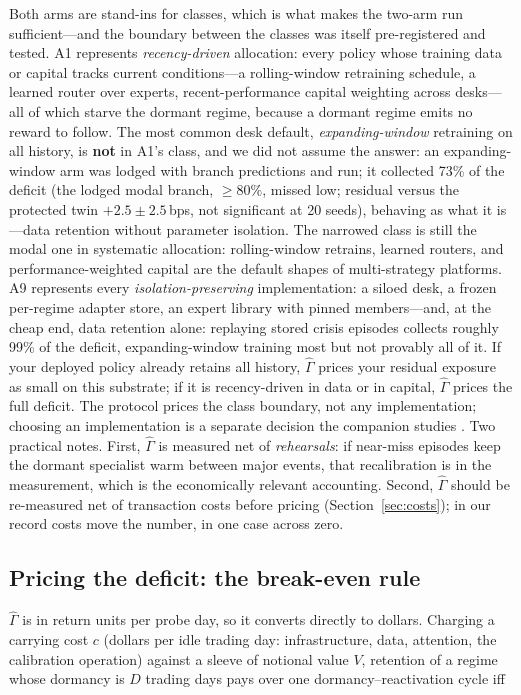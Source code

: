 \documentclass[sigconf,anonymous]{acmart}
\newcommand{\G}{\hat\Gamma}
\begin{document}
Both arms are stand-ins for classes, which is what makes the two-arm
run sufficient---and the boundary between the classes was itself
pre-registered and tested. A1 represents \emph{recency-driven}
allocation: every policy whose training data or capital tracks
current conditions---a rolling-window retraining schedule, a learned
router over experts, recent-performance capital weighting across
desks---all of which starve the dormant regime, because a
dormant regime emits no reward to follow. The most common desk
default, \emph{expanding-window} retraining on all history, is
\textbf{not} in A1's class, and we did not assume the answer: an
expanding-window arm was lodged with branch predictions and run; it
collected 73\% of the deficit (the lodged modal branch, ${\ge}80\%$,
missed low; residual versus the protected twin
$+2.5 \pm 2.5$\,bps, not significant at 20 seeds), behaving as what it
is---data retention without parameter isolation. The narrowed class is
still the modal one in systematic allocation: rolling-window retrains,
learned routers, and performance-weighted capital are the default
shapes of multi-strategy platforms. A9 represents every
\emph{isolation-preserving} implementation: a siloed desk, a frozen
per-regime adapter store, an expert library with pinned members---and,
at the cheap end, data retention alone: replaying stored crisis
episodes collects roughly 99\% of the deficit, expanding-window
training most but not provably all of it. If your deployed policy
already retains all history, $\G$ prices your residual exposure as
small on this substrate; if it is recency-driven in data or in
capital, $\G$ prices the full deficit. The
protocol prices the class boundary, not any implementation; choosing
an implementation is a separate decision the companion studies
\cite{companion2026}. Two practical notes. First, $\G$ is measured
net of \emph{rehearsals}: if near-miss episodes keep the dormant
specialist warm between major events, that recalibration is in the
measurement, which is the economically relevant accounting. Second,
$\G$ should be re-measured net of transaction costs before pricing
(Section~\ref{sec:costs}); in our record costs move the number, in
one case across zero.

\subsection{Pricing the deficit: the break-even rule}
\label{sec:breakeven}

$\G$ is in return units per probe day, so it converts directly to
dollars. Charging a carrying cost $c$ (dollars per idle trading day:
infrastructure, data, attention, the calibration operation) against a
sleeve of notional value $V$, retention of a regime whose dormancy is
$D$ trading days pays over one dormancy--reactivation cycle iff
\end{document}
